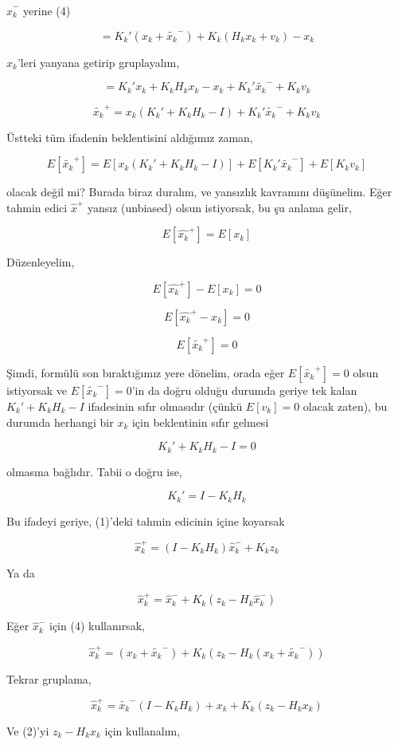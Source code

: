 \documentclass[12pt,fleqn]{article}\usepackage{../../common}
\begin{document}
$\hat{x}_k^-$ yerine (4)

$$  = K_k' (x_k + \tilde{x_k}^-) + K_k(H_k x_k + v_k) - x_k   $$

$x_k$'leri yanyana getirip gruplayalım,

$$  = K_k' x_k + K_kH_k x_k  - x_k + K_k'\tilde{x_k}^- + K_kv_k   $$

$$ \tilde{x_k}^+ = x_k (K_k' + K_kH_k - I) + K_k'\tilde{x_k}^- + K_kv_k   $$

Üstteki tüm ifadenin beklentisini aldığımız zaman,

$$ E[\tilde{x_k}^+] = E[x_k (K_k' + K_kH_k - I)] + E[K_k'\tilde{x_k}^-] + E[K_kv_k]  $$

olacak değil mi? Burada biraz duralım, ve yansızlık kavramını düşünelim. Eğer
tahmin edici $\hat{x}^+$ yansız (unbiased) olsun istiyorsak, bu şu anlama gelir,

$$ E[\hat{x_k}^+] = E[x_k] $$

Düzenleyelim,

$$ E[\hat{x_k}^+] - E[x_k] = 0$$

$$ E[\hat{x_k}^+ - x_k] = 0$$

$$ E[ \tilde{x_k}^+] = 0$$

Şimdi, formülü son bıraktığımız yere dönelim, orada eğer $E[\tilde{x_k}^+]=0$
olsun istiyorsak ve $E[\tilde{x_k}^-] = 0$'in da doğru olduğu durumda geriye tek
kalan $K_k' + K_kH_k - I$ ifadesinin sıfır olmasıdır (çünkü $E[v_k]=0$ olacak
zaten), bu durumda herhangi bir $x_k$ için beklentinin sıfır gelmesi

$$ K_k' + K_kH_k - I = 0 $$

olmasına bağlıdır. Tabii o doğru ise,

$$ K_k' = I - K_kH_k  $$

Bu ifadeyi geriye, (1)'deki tahmin edicinin içine koyarsak

$$ \hat{x}_k^+  = (I - K_kH_k ) \hat{x}_k^- + K_kz_k  $$

Ya da 

$$ \hat{x}_k^+  = \hat{x}_k^- + K_k(z_k - H_k\hat{x}_k^- )  $$

Eğer $\hat{x}_k^-$ için (4) kullanırsak,

$$ \hat{x}_k^+  =  (x_k + \tilde{x_k}^-) + K_k(z_k - H_k( x_k + \tilde{x_k}^-) )  $$

Tekrar gruplama, 

$$ \hat{x}_k^+  =  \tilde{x_k}^- (I - K_kH_k) + x_k + K_k(z_k - H_kx_k)   $$

Ve (2)'yi $z_k - H_kx_k$ için kullanalım,
\end{document}
